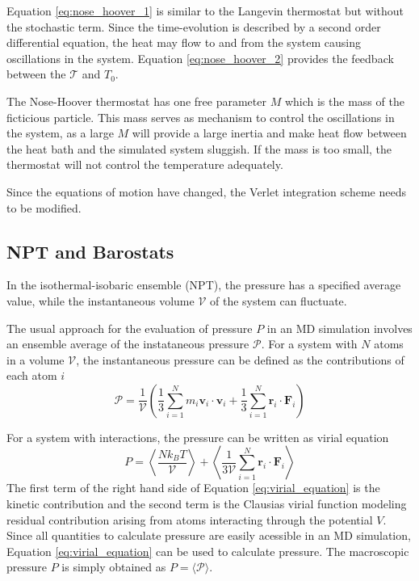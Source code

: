 Equation \ref{eq:nose_hoover_1} is similar to the Langevin thermostat but without the stochastic term.  Since the time-evolution is described by a second order differential equation, the heat may flow to and from the system causing oscillations in the system. Equation \ref{eq:nose_hoover_2} provides the feedback between the $\mathcal{T}$ and $T_0$.

The Nose-Hoover thermostat has one free parameter $M$ which is the mass of the ficticious particle.  This mass serves as mechanism to control the oscillations in the system, as a large $M$ will provide a large inertia and make heat flow between the heat bath and the simulated system sluggish.  If the mass is too small, the thermostat will not control the temperature adequately.

Since the equations of motion have changed, the Verlet integration scheme needs to be modified.

\subsection{NPT and Barostats}
\label{sec:npt_ensemble}
In the isothermal-isobaric ensemble (NPT), the pressure has a specified average value, while the instantaneous volume $\mathcal{V}$ of the system can fluctuate.

The usual approach for the evaluation of pressure $P$ in an MD simulation involves an ensemble average of the instataneous pressure $\mathcal{P}$\cite{allen1987_md}.  For a system with $N$ atoms in a volume $\mathcal{V}$, the instantaneous pressure can be defined as the contributions of each atom $i$
\begin{equation}
  \mathcal{P}
  =
  \frac{1}{\mathcal{V}}
  \left(
    \frac{1}{3}
    \sum_{i=1}^N m_i \bm{v}_i  \cdot \bm{v}_i
    +
    \frac{1}{3}
    \sum_{i=1}^N \bm{r}_i \cdot \bm{F}_i
  \right)
\end{equation}

For a system with interactions, the pressure can be written as virial equation\cite{tadmor2011_md}
\begin{equation}
  \label{eq:virial_equation}
  P
	=
	\left\langle
	  \frac{N k_B T}{\mathcal{V}}
  \right\rangle
  +
	\left\langle
	  \frac{1}
		     {3\mathcal{V}}
    \sum_{i=1}^N
        \bm{r}_i \cdot \bm{F}_{i}
	\right\rangle
\end{equation}
The first term of the right hand side of Equation \ref{eq:virial_equation} is the kinetic contribution and the second term is the Clausias virial function modeling residual contribution arising from atoms interacting through the potential $V$.  Since all quantities to calculate pressure are easily acessible in an MD simulation, Equation \ref{eq:virial_equation} can be used to calculate pressure.  The macroscopic pressure $P$ is simply obtained as $P=\langle \mathcal{P} \rangle$.

